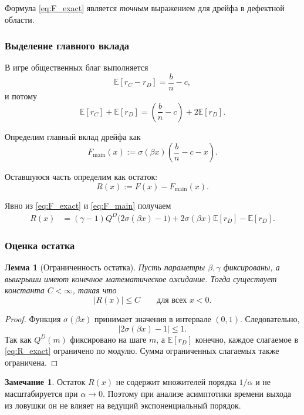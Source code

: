 \documentclass[12pt,a4paper]{article}
\newtheorem{lemma}{Лемма}
\theoremstyle{definition}
\newtheorem{remark}{Замечание}
\begin{document}
Формула \eqref{eq:F_exact} является \emph{точным} выражением для дрейфа
в дефектной области.

\subsubsection{Выделение главного вклада}

В игре общественных благ выполняется
\[
\mathbb E[r_C-r_D]=\frac{b}{n}-c,
\]
и потому
\[
\mathbb E[r_C]+\mathbb E[r_D]
=
\left(\frac{b}{n}-c\right)
+
2\mathbb E[r_D].
\]

Определим главный вклад дрейфа как
\begin{equation}
F_{\mathrm{main}}(x)
:=
\sigma(\beta x)
\left(
\frac{b}{n}-c-x
\right).
\label{eq:F_main}
\end{equation}

Оставшуюся часть определим как остаток:
\[
R(x)
:=
F(x)-F_{\mathrm{main}}(x).
\]

Явно из \eqref{eq:F_exact} и \eqref{eq:F_main} получаем
\begin{align}
R(x)
&=
(\gamma-1)Q^D\bigl(2\sigma(\beta x)-1\bigr)
+
2\sigma(\beta x)\mathbb E[r_D]
-
\mathbb E[r_D].
\label{eq:R_exact}
\end{align}

\subsubsection{Оценка остатка}

\begin{lemma}[Ограниченность остатка]
\label{lem:R_bound}
Пусть параметры $\beta,\gamma$ фиксированы, а выигрыши имеют конечное
математическое ожидание.
Тогда существует константа $C<\infty$, такая что
\[
|R(x)| \le C
\qquad
\text{для всех } x<0.
\]
\end{lemma}

\begin{proof}
Функция $\sigma(\beta x)$ принимает значения в интервале $(0,1)$.
Следовательно,
\[
|2\sigma(\beta x)-1|\le 1.
\]
Так как $Q^D(m)$ фиксировано на шаге $m$, а $\mathbb E[r_D]$ конечно,
каждое слагаемое в \eqref{eq:R_exact} ограничено по модулю.
Сумма ограниченных слагаемых также ограничена.
\end{proof}

\begin{remark}
Остаток $R(x)$ не содержит множителей порядка $1/\alpha$ и не масштабируется
при $\alpha\to0$.
Поэтому при анализе асимптотики времени выхода из ловушки
он не влияет на ведущий экспоненциальный порядок.
\end{remark}
\end{document}
